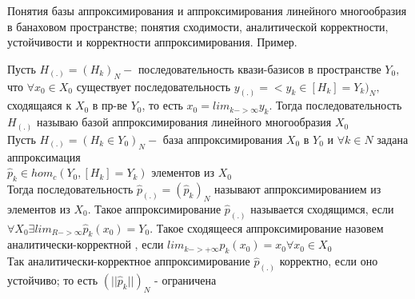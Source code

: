 \documentclass[__main__.tex]{subfiles}
\begin{document}
Понятия базы аппроксимирования и аппроксимирования линейного многообразия в банаховом пространстве; понятия сходимости, аналитической корректности, устойчивости и корректности аппроксимирования. Пример.


Пусть $H_{(.)} = (H_k)_N - $ последовательность квази-базисов в пространстве $Y_0,$ что $\forall x_0\in X_0$ существует последовательность $y_{(.)}=<y_k\in [H_k]=Y_k)_N,$ сходящаяся к $X_0$ в пр-ве $Y_0$, то есть $x_0=lim_{k->\infty}y_k.$ Тогда последовательность $H_{(.)}$ называю базой аппроксимирования линейного многообразия $X_0$ \\

Пусть $H_{(.)}=(H_k \in Y_0)_N - $ база аппроксимирования $X_0$ в $Y_0$  и $\forall k \in N$ задана аппроксимация\\
$\hat{p}_k \in hom_c (Y_0,[H_k]=Y_k)$ элементов из $X_0$\\
Тогда последовательность $\hat{p}_{(.)}=(\hat{p}_k)_N $ называют аппроксимированием из элементов из $X_0$. Такое аппроксимирование  $\hat{p}_{(.)}$ называется сходящимся, если $\forall X_0 \exists lim_{R->\infty} \hat{p}_k (x_0) = Y_0$. Такое сходящееся аппроксимирование назовем аналитически-корректной , если $lim_{k->+\infty}\hat{p}_k(x_0)=x_0 \forall x_0\in X_0$\\
Так аналитически-корректное аппроксимирование $\hat{p}_{(.)}$ корректно, если оно устойчиво; то есть $(||\hat{p}_k||)_N$ - ограничена\\
\end{document}
